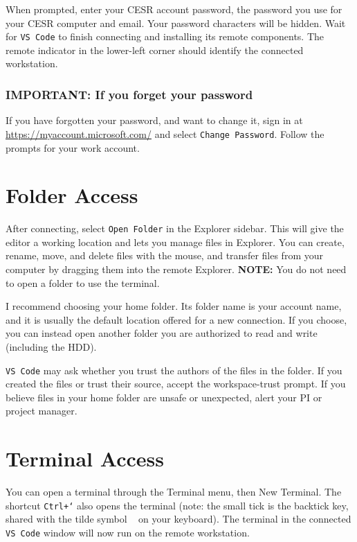 \documentclass[12pt]{article}
\newcommand{\keyshortcut}[1]{\begingroup\setlength{\fboxsep}{2pt}%
  \colorbox{ShortcutBackground}{\texttt{#1}}\endgroup}
\newcommand{\program}[1]{\begingroup\setlength{\fboxsep}{2pt}%
  \colorbox{ProgramBackground}{\texttt{#1}}\endgroup}
\newcommand{\inlinecode}[1]{\begingroup\setlength{\fboxsep}{2pt}%
  \colorbox{black!5}{\texttt{#1}}\endgroup}
\begin{document}
When prompted, enter your CESR account password, the password you use for your CESR computer and email. Your password characters will be hidden. Wait for \program{VS Code} to finish connecting and installing its remote components. The remote indicator in the lower-left corner should identify the connected workstation.

\subsubsection*{IMPORTANT: If you forget your password}
If you have forgotten your password, and want to change it, sign in at \url{https://myaccount.microsoft.com/} and select \inlinecode{Change Password}. Follow the prompts for your work account.

\section*{Folder Access}

After connecting, select \inlinecode{Open Folder} in the Explorer sidebar. This will give the editor a working location and lets you manage files in Explorer. You can create, rename, move, and delete files with the mouse, and transfer files from your computer by dragging them into the remote Explorer. \textbf{NOTE:} You do not need to open a folder to use the terminal.

I recommend choosing your home folder. Its folder name is your account name, and it is usually the default location offered for a new connection. If you choose, you can instead open another folder you are authorized to read and write (including the HDD).

\program{VS Code} may ask whether you trust the authors of the files in the folder. If you created the files or trust their source, accept the workspace-trust prompt. If you believe files in your home folder are unsafe or unexpected, alert your PI or project manager.

\section*{Terminal Access}

You can open a terminal through the Terminal menu, then New Terminal. The shortcut \keyshortcut{Ctrl+`} also opens the terminal (note: the small tick is the backtick key, shared with the tilde symbol \inlinecode{\string~} on your keyboard). The terminal in the connected \program{VS Code} window will now run on the remote workstation. 
\end{document}
